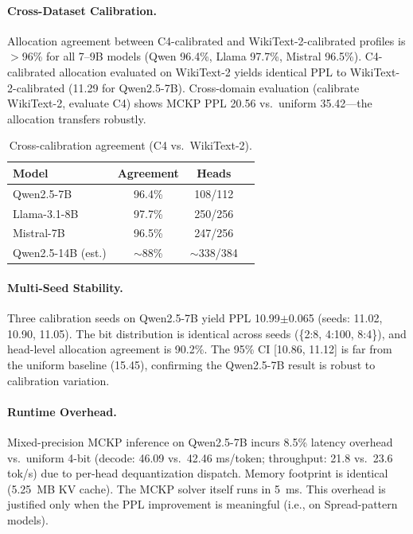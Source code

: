 \documentclass[11pt,a4paper]{article}
\begin{document}
\paragraph{Cross-Dataset Calibration.}
Allocation agreement between C4-calibrated and WikiText-2-calibrated profiles is $>$96\% for all 7--9B models (Qwen 96.4\%, Llama 97.7\%, Mistral 96.5\%). C4-calibrated allocation evaluated on WikiText-2 yields identical PPL to WikiText-2-calibrated (11.29 for Qwen2.5-7B). Cross-domain evaluation (calibrate WikiText-2, evaluate C4) shows MCKP PPL 20.56 vs.\ uniform 35.42---the allocation transfers robustly.

\begin{table}[t]
\centering
\small
\begin{tabular}{lccc}
\toprule
\textbf{Model} & \textbf{Agreement} & \textbf{Heads} \\
\midrule
Qwen2.5-7B  & 96.4\% & 108/112 \\
Llama-3.1-8B & 97.7\% & 250/256 \\
Mistral-7B   & 96.5\% & 247/256 \\
Qwen2.5-14B (est.) & $\sim$88\% & $\sim$338/384 \\
\bottomrule
\end{tabular}
\caption{Cross-calibration agreement (C4 vs.\ WikiText-2).}
\label{tab:crosscal}
\end{table}

\paragraph{Multi-Seed Stability.}
Three calibration seeds on Qwen2.5-7B yield PPL 10.99$\pm$0.065 (seeds: 11.02, 10.90, 11.05). The bit distribution is identical across seeds (\{2:8, 4:100, 8:4\}), and head-level allocation agreement is 90.2\%. The 95\% CI [10.86, 11.12] is far from the uniform baseline (15.45), confirming the Qwen2.5-7B result is robust to calibration variation.

\paragraph{Runtime Overhead.}
Mixed-precision MCKP inference on Qwen2.5-7B incurs 8.5\% latency overhead vs.\ uniform 4-bit (decode: 46.09 vs.\ 42.46 ms/token; throughput: 21.8 vs.\ 23.6 tok/s) due to per-head dequantization dispatch. Memory footprint is identical (5.25~MB KV cache). The MCKP solver itself runs in 5~ms. This overhead is justified only when the PPL improvement is meaningful (i.e., on Spread-pattern models).
\end{document}
